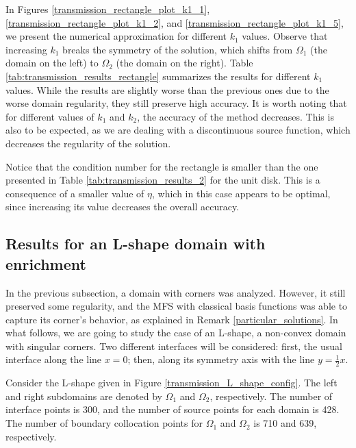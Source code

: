 In Figures \ref{transmission_rectangle_plot_k1_1}, \ref{transmission_rectangle_plot_k1_2}, and \ref{transmission_rectangle_plot_k1_5}, we present the numerical approximation for different \(k_1\) values. Observe that increasing \(k_1\) breaks the symmetry of the solution, which shifts from \(\Omega_1\) (the domain on the left) to \(\Omega_2\) (the domain on the right). Table \ref{tab:transmission_results_rectangle} summarizes the results for different \(k_1\) values. While the results are slightly worse than the previous ones due to the worse domain regularity, they still preserve high accuracy. It is worth noting that for different values of \(k_1\) and \(k_2\), the accuracy of the method decreases. This is also to be expected, as we are dealing with a discontinuous source function, which decreases the regularity of the solution.

Notice that the condition number for the rectangle is smaller than the one presented in Table \ref{tab:transmission_results_2} for the unit disk. This is a consequence of a smaller value of \(\eta\), which in this case appears to be optimal, since increasing its value decreases the overall accuracy.

\subsection{Results for an L-shape domain with enrichment}

In the previous subsection, a domain with corners was analyzed. However, it still preserved some regularity, and the MFS with classical basis functions was able to capture its corner's behavior, as explained in Remark \ref{particular_solutions}. In what follows, we are going to study the case of an L-shape, a non-convex domain with singular corners. Two different interfaces will be considered: first, the usual interface along the line \(x=0\); then, along its symmetry axis with the line \(y=\frac{1}{2}x\).

Consider the L-shape given in Figure \ref{transmission_L_shape_config}. The left and right subdomains are denoted by \(\Omega_1\) and \(\Omega_2\), respectively. The number of interface points is 300, and the number of source points for each domain is 428. The number of boundary collocation points for \(\Omega_1\) and \(\Omega_2\) is 710 and 639, respectively.



